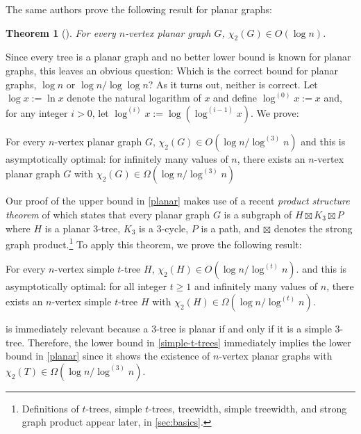 \documentclass[kpfonts]{patmorin}
\newcommand{\trn}{\chi_2}
\newtheorem{othertheorem}{Theorem}
\theoremstyle{named}
\begin{document}
The same authors prove the following result for planar graphs:

\setcounter{othertheorem}{15}
\begin{othertheorem}[\cite{karpas.neiman.ea:on}]\label{planar-graphs}
    For every $n$-vertex planar graph $G$, $\trn(G)\in O(\log n)$.
\end{othertheorem}

Since every tree is a planar graph and no better lower bound is known for planar graphs, this leaves an obvious question:  Which is the correct bound for planar graphs, $\log n$ or $\log n/\log\log n$?  As it turns out, neither is correct.  Let $\log x :=\ln x$ denote the natural logarithm of $x$ and define $\log^{(0)}x:=x$ and, for any integer $i>0$, let $\log^{(i)}x:=\log(\log^{(i-1)} x)$. We prove:


\begin{thm}\label{planar}
    For every $n$-vertex planar graph $G$, $\trn(G)\in O(\log n/\log^{(3)} n)$ and this is asymptotically optimal: for infinitely many values of $n$, there exists an $n$-vertex planar graph $G$ with $\trn(G)\in \Omega(\log n/\log^{(3)} n)$
\end{thm}

Our proof of the upper bound in \cref{planar} makes use of a recent \emph{product structure theorem} of \citet{dujmovic.joret.ea:planar} which states that every planar graph $G$ is a subgraph of $H\boxtimes K_3\boxtimes P$ where $H$ is a planar $3$-tree, $K_3$ is a 3-cycle, $P$ is a path, and $\boxtimes$ denotes the strong graph product.\footnote{Definitions of $t$-trees, simple $t$-trees, treewidth, simple treewidth, and strong graph product appear later, in \cref{sec:basics}.}  To apply this theorem, we prove the following result:

\begin{thm}\label{simple-t-trees}
    For every $n$-vertex simple $t$-tree $H$, $\trn(H) \in O(\log n/\log^{(t)}n)$.
    and this is asymptotically optimal: for all integer $t\ge 1$ and infinitely many values of $n$, there exists an $n$-vertex simple $t$-tree $H$ with $\trn(H)\in\Omega(\log n/\log^{(t)} n)$.
\end{thm}

 is immediately relevant because a 3-tree is planar if and only if it is a simple $3$-tree. Therefore, the lower bound in \cref{simple-t-trees} immediately implies the lower bound in \cref{planar} since it shows the existence of $n$-vertex planar graphs with $\trn(T)\in\Omega(\log n/\log^{(3)} n)$.
\end{document}
